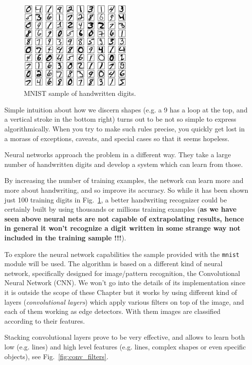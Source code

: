\begin{figure}[b]
\centering
\includegraphics[width=0.5\textwidth]{figures/mnist_100_digits}
\caption{MNIST sample of handwritten digits.}
\label{fig:mnist}
\end{figure}

Simple intuition about how we discern shapes (e.g. a 9 has a loop at the top, and a vertical stroke in the bottom right) turns out to be not so simple to express algorithmically. When you try to make such rules precise, you quickly get lost in a morass of exceptions, caveats, and special cases so that it seems hopeless.

Neural networks approach the problem in a different way. They take a large number of handwritten digits and develop a system which can learn from those.

By increasing the number of training examples, the network can learn more and more about handwriting, and so improve its accuracy. So while it has been shown just 100 training digits in Fig.~\ref{fig:mnist}, a better handwriting recognizer could be certainly built by using thousands or millions training examples (\textbf{as we have seen above neural nets are not capable of extrapolating results, hence in general it won't recognize a digit written in some strange way not included in the training sample !!!}).

To explore the neural network capabilities the sample provided with the \texttt{mnist} module will be used. 
The algorithm is based on a different kind of neural network, specifically designed for image/pattern recognition, the Convolutional Neural Network (CNN). We won't go into the details of its implementation since it is outside the scope of these Chapter but it works by using different kind of layers (\emph{convolutional layers}) which apply various filters on top of the image, and each of them working as edge detectors. With them images are classified according to their features.

Stacking convolutional layers prove to be very effective, and allows to learn both low (e.g. lines) and high level features (e.g. lines, complex shapes or even specific objects), see Fig.~\ref{fig:conv_filters}.

